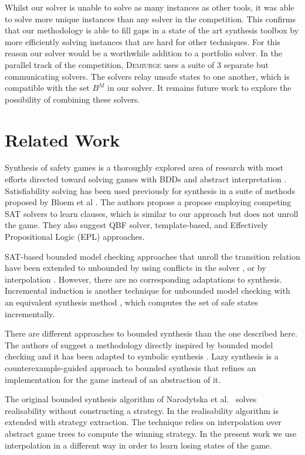 \documentclass{llncs}
\begin{document}
Whilst our solver is unable to solve as many instances as other tools, it was
able to solve more unique instances than any solver in the competition. This
confirms that our methodology is able to fill gaps in a state of the art
synthesis toolbox by more efficiently solving instances that are hard for other
techniques. For this reason our solver would be a worthwhile addition to a
portfolio solver. In the parallel track of the competition, \textsc{Demiurge}
uses a suite of 3 separate but communicating solvers. The solvers
relay unsafe states to one another, which is compatible with the set $B^M$ in
our solver. It remains future work to explore the possibility of combining
these solvers.

\section{Related Work}

Synthesis of safety games is a thoroughly explored area of research with most
efforts directed toward solving games with BDDs \cite{burch1990} and abstract
interpretation \cite{walker2014,brenguier2014}. Satisfiability solving has been used
previously for synthesis in a suite of methods proposed by Bloem et al
\cite{bloem2014}. The authors propose a propose employing competing SAT solvers
to learn clauses, which is similar to our approach but does not unroll the
game. They also suggest QBF solver, template-based, and Effectively
Propositional Logic (EPL) approaches.

SAT-based bounded model checking approaches that unroll the transition relation
have been extended to unbounded by using conflicts in the solver
\cite{mcmillan2002}, or by interpolation \cite{mcmillan2003}. However, there
are no corresponding adaptations to synthesis. Incremental induction
\cite{bradley2011} is another technique for unbounded model checking with an
equivalent synthesis method \cite{morgenstern2013}, which computes the set of
safe states incrementally.

There are different approaches to bounded synthesis than the one described
here. The authors of \cite{finkbeiner2013} suggest a methodology directly
inspired by bounded model checking and it has been adapted to symbolic
synthesis \cite{ehlers2010}. Lazy synthesis \cite{finkbeiner2012} is a
counterexample-guided approach to bounded synthesis that refines an
implementation for the game instead of an abstraction of it.

The original bounded synthesis algorithm of Narodytska et
al.~\cite{narodytska2014} solves realisability without constructing a strategy.
In \cite{een2015} the realisability algorithm is extended with strategy
extraction. The technique relies on interpolation over abstract game trees to
compute the winning strategy.  In
the present work we use interpolation in a different way in order to learn
losing states of the game.
\end{document}

